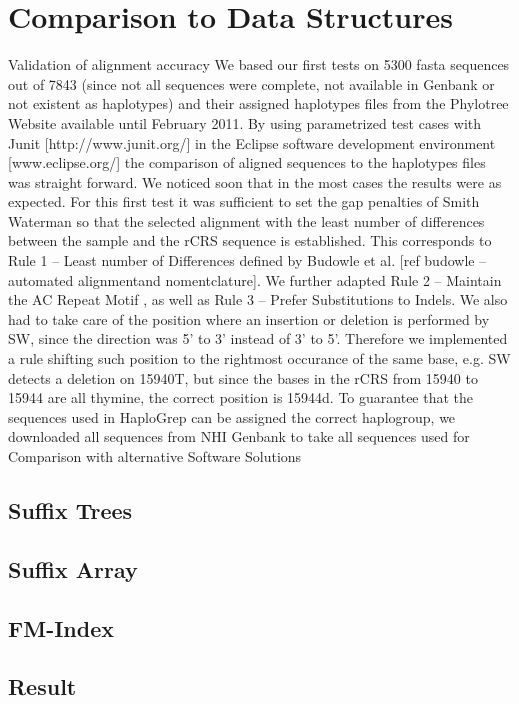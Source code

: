 \section{Comparison to Data Structures}
Validation of alignment accuracy
We based our first tests on 5300 fasta sequences out of 7843 (since not all sequences were complete, not available in Genbank or not existent as haplotypes) and their assigned haplotypes files from the Phylotree Website available until February 2011. By using parametrized test cases with Junit [http://www.junit.org/] in the Eclipse software development environment [www.eclipse.org/] the comparison of aligned sequences to the haplotypes files was straight forward. We noticed soon that in the most cases the results were as expected. For this first test it was sufficient to set the gap penalties of Smith Waterman so that the selected alignment with the least number of differences between the sample and the rCRS sequence is established. This corresponds to Rule 1 – Least number of Differences defined by Budowle et al. [ref budowle – automated alignmentand nomentclature]. We further adapted Rule 2 – Maintain the AC Repeat Motif , as well as Rule 3 – Prefer Substitutions to Indels. We also had to take care of the position where an insertion or deletion is performed by SW, since the direction was 5’ to 3’ instead of 3’ to 5’. Therefore we implemented a rule shifting such position to the rightmost occurance of the same base, e.g. SW detects a deletion on 15940T, but since the bases in the rCRS from 15940 to 15944 are all thymine, the correct position is 15944d. To guarantee that the sequences used in HaploGrep can be assigned the correct haplogroup, we downloaded all sequences from NHI Genbank  to take all sequences used for Comparison with alternative Software Solutions
\subsection{Suffix Trees}
\subsection{Suffix Array}
\subsection{FM-Index}
\subsection{Result}
